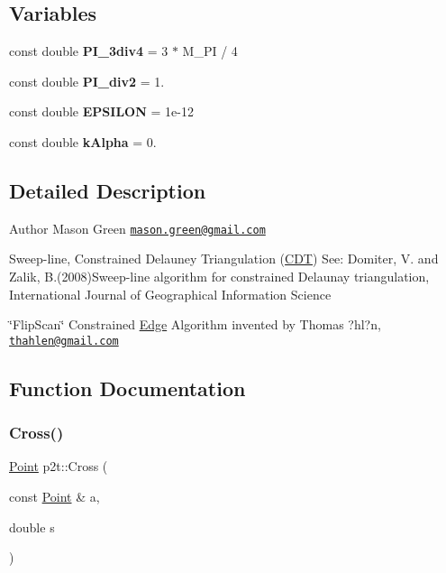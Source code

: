 \subsection*{Variables}
\begin{DoxyCompactItemize}
\item 
\mbox{\label{namespacep2t_a8f5d342ebd2614a9169a41fa6952b5f9}} 
const double {\bfseries P\+I\+\_\+3div4} = 3 $\ast$ M\+\_\+\+PI / 4
\item 
\mbox{\label{namespacep2t_abd7f6949620798fa69359d45d8c46f98}} 
const double {\bfseries P\+I\+\_\+div2} = 1.
\item 
\mbox{\label{namespacep2t_ac5421d160ad8cd832c3cf6483d378e24}} 
const double {\bfseries E\+P\+S\+I\+L\+ON} = 1e-\/12
\item 
\mbox{\label{namespacep2t_aed2c5457dd827e0781c4dbfa6adfb583}} 
const double {\bfseries k\+Alpha} = 0.
\end{DoxyCompactItemize}


\subsection{Detailed Description}
\begin{DoxyAuthor}{Author}
Mason Green \href{mailto:mason.green@gmail.com}{\tt mason.\+green@gmail.\+com}
\end{DoxyAuthor}
Sweep-\/line, Constrained Delauney Triangulation (\hyperlink{classp2t_1_1CDT}{C\+DT}) See\+: Domiter, V. and Zalik, B.(2008)\textquotesingle{}Sweep-\/line algorithm for constrained Delaunay triangulation\textquotesingle{}, International Journal of Geographical Information Science

\char`\"{}\+Flip\+Scan\char`\"{} Constrained \hyperlink{structp2t_1_1Edge}{Edge} Algorithm invented by Thomas ?hl?n, \href{mailto:thahlen@gmail.com}{\tt thahlen@gmail.\+com} 

\subsection{Function Documentation}
\mbox{\label{namespacep2t_aea08cc5eefe8a698251b03beabff716a}} 
\subsubsection{\texorpdfstring{Cross()}{Cross()}\hspace{0.1cm}{\footnotesize\ttfamily [1/2]}}
{\footnotesize\ttfamily \hyperlink{structp2t_1_1Point}{Point} p2t\+::\+Cross (\begin{DoxyParamCaption}\item[{const \hyperlink{structp2t_1_1Point}{Point} \&}]{a,  }\item[{double}]{s }\end{DoxyParamCaption})\hspace{0.3cm}{\ttfamily [inline]}}


